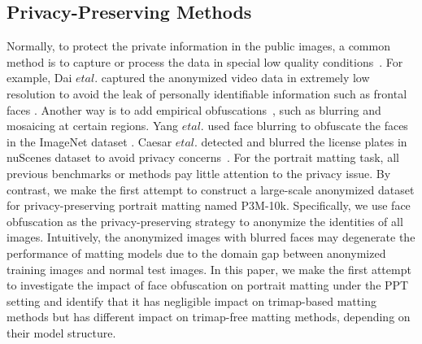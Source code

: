 \documentclass[sigconf]{acmart}
\begin{document}
\subsection{Privacy-Preserving Methods}

Normally, to protect the private information in the public images, a common method is to capture or process the data in special low quality conditions~\cite{dai2015towards,butler2015privacy}. For example, Dai $et al$. captured the anonymized video data in extremely low resolution to avoid the leak of personally identifiable information such as frontal faces \cite{dai2015towards}. Another way is to add empirical obfuscations~\cite{uittenbogaard2019privacy,caesar2020nuscenes,frome2009large}, such as blurring and mosaicing at certain regions. Yang $et al$. used face blurring to obfuscate the faces in the ImageNet dataset \cite{yang2021study}. Caesar $et al$. detected and blurred the license plates in nuScenes dataset to avoid privacy concerns~\cite{caesar2020nuscenes}. For the portrait matting task, all previous benchmarks or methods pay little attention to the privacy issue. By contrast, we make the first attempt to construct a large-scale anonymized dataset for privacy-preserving portrait matting named P3M-10k. Specifically, we use face obfuscation as the privacy-preserving strategy to anonymize the identities of all images. Intuitively, the anonymized images with blurred faces may degenerate the performance of matting models due to the domain gap between anonymized training images and normal test images. In this paper, we make the first attempt to investigate the impact of face obfuscation on portrait matting under the PPT setting and identify that it has negligible impact on trimap-based matting methods but has different impact on trimap-free matting methods, depending on their model structure.
\end{document}
